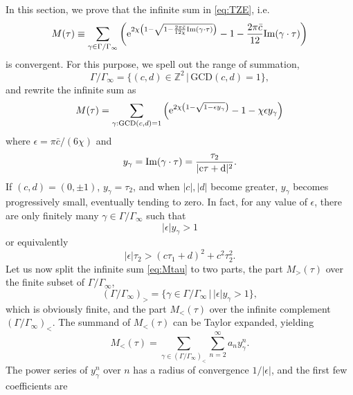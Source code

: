 \documentclass[aps,twocolumn,prl,showpacs,amsmath,amssymb,10pt]{revtex4-2}
\def\tc{\bar{c}}
\begin{document}
In this section, we prove that the infinite sum in \eqref{eq:TZE}, i.e.
\begin{equation}\label{eq:Mtau}
M(\tau)\equiv\sum_{\gamma\in\Gamma/\Gamma_{\infty}}
\left({\rm e}^{2\chi\left(1-\sqrt{1-\frac{2\pi \tc}{12\chi}\text{Im}(\gamma\cdot\tau)} \right)}
 -1-\frac{2\pi \tc}{12}\text{Im}(\gamma\cdot\tau)\right)
\end{equation}
is convergent.
For this purpose, we spell out the range of summation,
\begin{equation}
    \Gamma/\Gamma_\infty = \{(c,d)\in\mathbb{Z}^2 \,|\, \text{GCD}(c,d) = 1\},
\end{equation}
and rewrite the infinite sum as
\begin{equation}
    M(\tau) = \sum_{\gamma:\text{GCD}(c,d)=1}
    \left({\rm e}^{2\chi\left(1-\sqrt{1-\epsilon y_\gamma} \right)}
 -1-\chi \epsilon y_\gamma\right)
\end{equation}
where $\epsilon=\pi \tc/(6\chi)$ and
\begin{equation}
    y_\gamma = \rm{Im}(\gamma\cdot\tau) = \frac{\tau_2}{|c\tau+d|^2}.
\end{equation}
If $(c,d) = (0,\pm 1)$, $y_\gamma = \tau_2$, and when $|c|,|d|$ become greater, $y_\gamma$ becomes progressively small, eventually tending to zero.
In fact, for any value of $\epsilon$, there are only finitely many $\gamma \in \Gamma/\Gamma_\infty$ such that
\begin{equation}
    |\epsilon| y_\gamma  > 1
\end{equation}
or equivalently
\begin{equation}
    |\epsilon|\tau_2 > (c\tau_1+d)^2 + c^2\tau_2^2.
\end{equation}
Let us now split the infinite sum  \eqref{eq:Mtau} to two parts, the part $M_{>}(\tau)$ over the finite subset of $\Gamma/\Gamma_\infty$,
\begin{equation}
    (\Gamma/\Gamma_\infty)_> = \{\gamma \in \Gamma/\Gamma_\infty \,|\, |\epsilon|y_\gamma>1\},
\end{equation}
which is obviously finite,
and the part $M_{<}(\tau)$ over the infinite complement $(\Gamma/\Gamma_\infty)_<$.
The summand of $M_{<}(\tau)$ can be Taylor expanded, yielding
\begin{equation}
    M_{<}(\tau)
    =\sum_{\gamma\in(\Gamma/\Gamma_\infty)_<}
    \sum_{n=2}^\infty a_n y^n_{\gamma}.
\end{equation}
The power series of $y_\gamma^n$ over $n$ has a radius of convergence $1/|\epsilon|$, and the first few coefficients are
\end{document}
